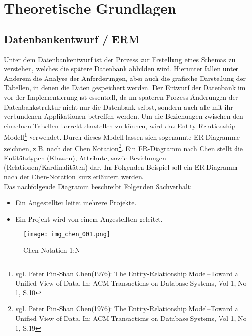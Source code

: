 \chapter{Theoretische Grundlagen}
\label{cha:theogrund}

\section{Datenbankentwurf / ERM}
\label{sec:erm}

Unter dem Datenbankentwurf ist der Prozess zur Erstellung eines Schemas zu verstehen, welches die spätere Datenbank abbilden wird.
Hierunter fallen unter Anderem die Analyse der Anforderungen, aber auch die grafische Darstellung der Tabellen, in denen die Daten gespeichert werden.
Der Entwurf der Datenbank im vor der Implementierung ist essentiell, da im späteren Prozess Änderungen der Datenbankstruktur nicht nur die Datenbank selbst, sondern auch alle mit ihr verbundenen Applikationen betreffen werden.
Um die Beziehungen zwischen den einzelnen Tabellen korrekt darstellen zu können, wird das Entity-Relationship-Modell\footnote{vgl. Peter Pin-Shan Chen(1976): The Entity-Relationship Model--Toward a Unified View of Data. In: ACM Transactions on Database Systems, Vol 1, No 1, S.10} verwendet.
Durch dieses Modell lassen sich sogenannte ER-Diagramme zeichnen, z.B. nach der Chen Notation\footnote{vgl. Peter Pin-Shan Chen(1976): The Entity-Relationship Model--Toward a Unified View of Data. In: ACM Transactions on Database Systems, Vol 1, No 1, S.19}.
Ein ER-Diagramm nach Chen stellt die Entitätstypen (Klassen), Attribute, sowie Beziehungen (Relationen/Kardinalitäten) dar.
Im Folgenden Beispiel soll ein ER-Diagramm nach der Chen-Notation kurz erläutert werden.\\

Das nachfolgende Diagramm beschreibt Folgenden Sachverhalt:

\begin{itemize}
\item Ein Angestellter leitet mehrere Projekte.
\item Ein Projekt wird von einem Angestellten geleitet.
\end{itemize}

\begin{figure}[H]
\begin{center}
\texttt{[image: img\_chen\_001.png]}
\caption{Chen Notation 1:N}
\label{chenpic1}
\end{center}
\end{figure}

